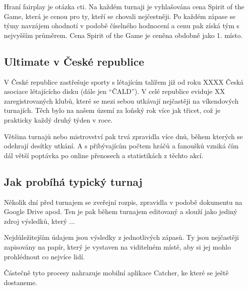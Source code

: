 \documentclass[thesis=B,czech]{FITthesis}[2012/06/26]
\begin{document}
\medskip

Hraní fairplay je otázka cti. Na každém turnaji je vyhlašována cena Spirit of the Game,
která je cenou pro ty, kteří se chovali nejčestněji. Po každém zápase se týmy navzájem ohodnotí
v podobě číselného hodnocení a cenu pak získá tým s nejvyšším průměrem. Cena Spirit of the Game
je ceněna obdobně jako 1. místo.

\subsection{Ultimate v České republice}

\indent

V České republice zastřešuje sporty s létajícím talířem již od roku XXXX Česká asociace
lé\-ta\-jícícho disku (dále jen ``ČALD''). V celé republice eviduje XX zaregistrovaných klubů,
které se mezi sebou utkávají nejčastěji na víkendových turnajích. Těch bylo na našem
území za loňský rok více jak třicet, což je prakticky každý druhý týden v roce.

\medskip

Většina turnajů nebo mistrovství pak trvá zpravidla více dnů, během kterých se odehrají desítky
utkání. A s přibývajícím počtem hráčů a fanoušků vzniká čím dál větší poptávka po online
přenosech a statistikách z těchto akcí.


\subsection{Jak probíhá typický turnaj}


\indent

Několik dní před turnajem se zveřejní rozpis, zpravidla v podobě dokumentu na Google Drive apod.
Ten je pak během turnajem editovaný a slouží jako jediný zdroj výsledků, který ... 

Nejdůležitejším údajem jsou výsledky z jednotlivých zápasů. Ty jsou nejčastěji zapisovány
na papír, který je vystaven na viditelném místě, aby si jej mohlo prohlédnout co nejvíce lidí.

\medskip

Částečně tyto procesy nahrazuje mobilní aplikace Catcher, ke které se ještě dostaneme.

\end{document}
